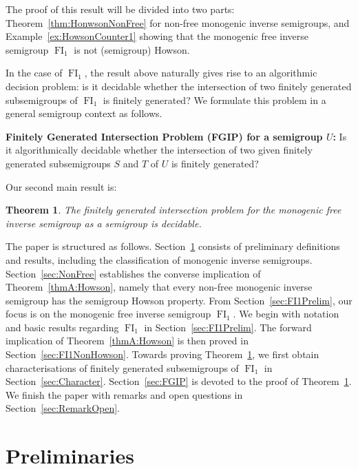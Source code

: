\documentclass[reqno]{amsart}
\theoremstyle{plain}
\newtheorem{thmAB}{Theorem}
\theoremstyle{definition}
\DeclareMathOperator{\FI}{FI}
\numberwithin{equation}{section}
\begin{document}
The proof of this result will be divided into two parts: Theorem~\ref{thm:HonwsonNonFree} for non-free monogenic inverse semigroups, and Example~\ref{ex:HowsonCounter1} showing that the monogenic free inverse semigroup $\FI_1$ is not (semigroup) Howson.



In the case of $\FI_1$, the result above naturally gives rise to an algorithmic decision problem:
is it decidable whether the intersection of two finitely generated subsemigroups of $\FI_1$ is finitely generated? 
We formulate this problem in a general semigroup context as follows.
\medskip

\noindent
\textbf{Finitely Generated Intersection Problem (FGIP) for a semigroup $U$:} Is it algorithmically decidable whether the intersection of two given finitely generated subsemigroups $S$ and $T$ of $U$ is finitely generated?
\medskip



Our second main result is:

\begin{thmAB}
\label{thmB:FGIP}
The finitely generated intersection problem for the monogenic free inverse semigroup as a semigroup is decidable.
\end{thmAB}

The paper is structured as follows. 
Section~\ref{sec:Prelim} consists of preliminary definitions and results, including the classification of monogenic inverse semigroups. 
Section~\ref{sec:NonFree} establishes the converse implication of Theorem~\ref{thmA:Howson}, namely that every non-free monogenic inverse semigroup has the semigroup Howson property.
From Section~\ref{sec:FI1Prelim}, our focus is on the monogenic free inverse semigroup $\FI_1$. We begin with notation and basic results regarding $\FI_1$ in Section~\ref{sec:FI1Prelim}. 
The forward implication of Theorem~\ref{thmA:Howson} is then proved in Section~\ref{sec:FI1NonHowson}.
Towards proving Theorem~\ref{thmB:FGIP}, 
we first obtain characterisations of finitely generated subsemigroups of $\FI_1$ in
Section~\ref{sec:Character}. Section~\ref{sec:FGIP} is devoted to the proof of Theorem~\ref{thmB:FGIP}. We finish the paper with remarks and open questions in Section~\ref{sec:RemarkOpen}.



\section{Preliminaries}
\label{sec:Prelim}
\end{document}
